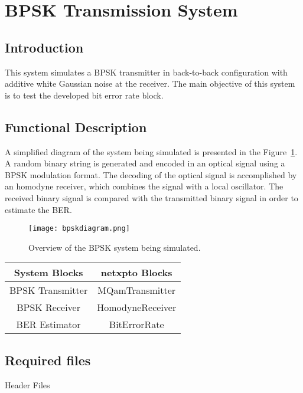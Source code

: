 \clearpage
\section{BPSK Transmission System}

\subsection*{Introduction}

This system simulates a BPSK transmitter in back-to-back configuration with additive white Gaussian noise at the receiver. The main objective of this system is to test the developed bit error rate block.


\subsection*{Functional Description}

A simplified diagram of the system being simulated is presented in the Figure~\ref{fig:homodynesystem}. A random binary string is generated and encoded in an optical signal using a BPSK modulation format. The decoding of the optical signal is accomplished by an homodyne receiver, which combines the signal with a local oscillator.
The received binary signal is compared with the transmitted binary signal in order to estimate the BER.

\begin{figure}[h]
\centering
\texttt{[image: bpskdiagram.png]}
\caption{Overview of the BPSK system being simulated.}
\label{fig:homodynesystem}
\end{figure}

\begin{table}[H]
\centering
\begin{tabular}{c|c}
System Blocks    & netxpto Blocks   \\ \hline
BPSK Transmitter & MQamTransmitter  \\
BPSK Receiver    & HomodyneReceiver \\
BER Estimator    & BitErrorRate
\end{tabular}
\end{table}

\subsection*{Required files}\label{Required files}

Header Files

